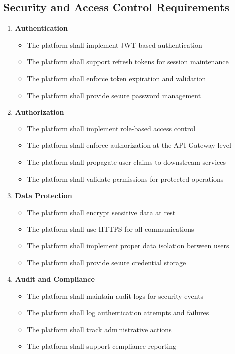 \subsection{Security and Access Control Requirements}

\begin{enumerate}
   \item \textbf{Authentication}
   \begin{itemize}
      \item The platform shall implement JWT-based authentication
      \item The platform shall support refresh tokens for session maintenance
      \item The platform shall enforce token expiration and validation
      \item The platform shall provide secure password management
   \end{itemize}

   \item \textbf{Authorization}
   \begin{itemize}
      \item The platform shall implement role-based access control
      \item The platform shall enforce authorization at the API Gateway level
      \item The platform shall propagate user claims to downstream services
      \item The platform shall validate permissions for protected operations
   \end{itemize}

   \item \textbf{Data Protection}
   \begin{itemize}
      \item The platform shall encrypt sensitive data at rest
      \item The platform shall use HTTPS for all communications
      \item The platform shall implement proper data isolation between users
      \item The platform shall provide secure credential storage
   \end{itemize}

   \item \textbf{Audit and Compliance}
   \begin{itemize}
      \item The platform shall maintain audit logs for security events
      \item The platform shall log authentication attempts and failures
      \item The platform shall track administrative actions
      \item The platform shall support compliance reporting
   \end{itemize}
\end{enumerate}

